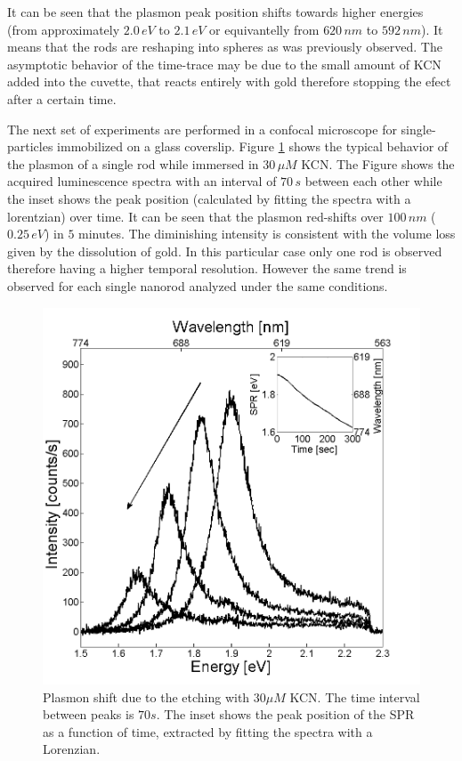 \documentclass[twocolumn]{article}
\begin{document}
It can be seen that the plasmon peak position shifts towards higher energies
(from approximately $2.0\,eV$ to $2.1\,eV$ or equivantelly from $620\,nm$ to
$592\,nm$). It means that the rods are reshaping into spheres as was previously
observed\cite{janaanisotropic2002}. The asymptotic behavior of the time-trace
may be due to the small amount of KCN added into the cuvette, that reacts
entirely with gold therefore stopping the efect after a certain time.

The next set of experiments are performed in a confocal microscope for
single-particles immobilized on a glass coverslip. Figure
\ref{fig:plasmon_single_rod} shows the typical behavior of the plasmon of a
single rod while immersed in $30\,\mu M$ KCN. The Figure shows the acquired
luminescence spectra with an interval of $70\,s$ between each other while the
inset shows the peak position (calculated by fitting the spectra with a
lorentzian) over time. It can be seen that the plasmon red-shifts over $100\,
nm$ ($0.25\, eV$) in $5$ minutes. The diminishing intensity is consistent with
the volume loss given by the dissolution of gold. In this particular case only
one rod is observed therefore having a higher temporal resolution. However the
same trend is observed for each single nanorod analyzed under the same
conditions.

\begin{figure}[hbt]
 \centering
 \includegraphics[width=0.95\linewidth]{plasmon_single_rod.png}
 \caption{Plasmon shift due to the etching with $30\mu M$ KCN. The time
 interval between peaks is $70s$. The inset shows the peak position of the SPR as a
 function of time, extracted by fitting the spectra with a Lorenzian.}
 \label{fig:plasmon_single_rod}
\end{figure}
\end{document}
